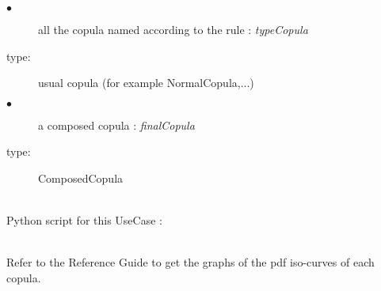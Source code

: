  
\noindent%
             {
               \begin{description}
               \item[$\bullet$] all the copula named according to the rule : {\itshape typeCopula}
               \item[type:] usual copula (for example NormalCopula,...)
               \item[$\bullet$] a composed copula : {\itshape finalCopula}
               \item[type:] ComposedCopula
               \end{description}
             }

             \textspace\\
             Python script for this UseCase :


             \textspace\\

             Refer to the Reference Guide to get the graphs of the pdf iso-curves of each copula.
